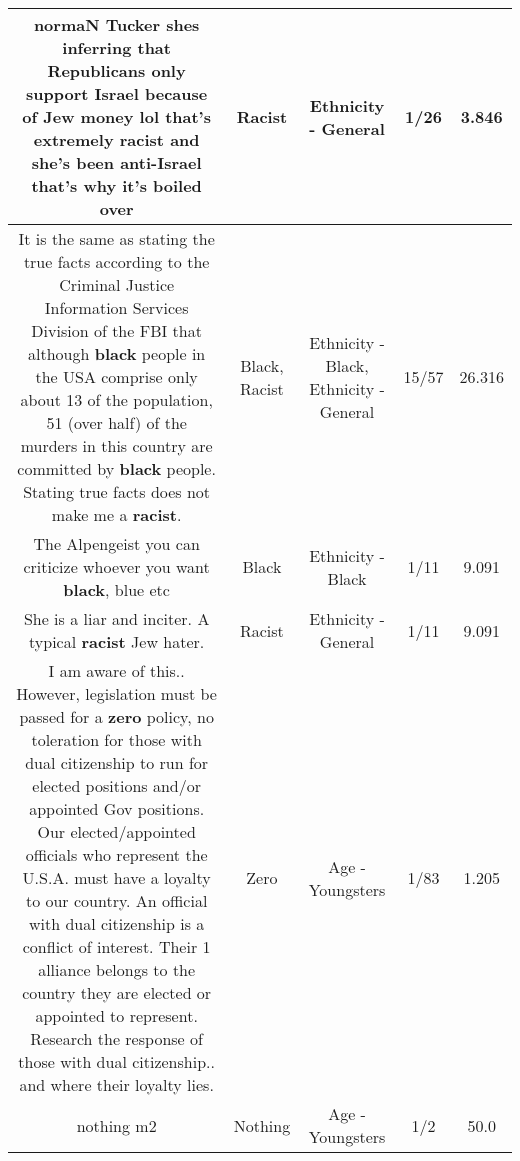 \documentclass[11pt]{article}
\newlength\mylength
\begin{document}
\begin{center}
\begin{longtable}{|C{.65\mylength}|C{.30\mylength}|C{.12\mylength}|C{.12\mylength}|C{.12\mylength}|}
  \small normaN Tucker shes inferring that Republicans only support Israel because of Jew money lol that's extremely \textbf{racist} and she's been anti-Israel that's why it's boiled over\normalsize   & Racist & Ethnicity - General & 1/26 & 3.846 \\  \hline
  \small It is the same as stating the true facts according to the Criminal Justice Information Services Division of the FBI that although \textbf{black} people in the USA comprise only about 13 of the population, 51 (over half) of the murders in this country are committed by \textbf{black} people. Stating true facts does not make me a \textbf{racist}.\normalsize   & Black, Racist & Ethnicity - Black, Ethnicity - General & 15/57 & 26.316 \\  \hline
  \small The Alpengeist you can criticize whoever you want \textbf{black}, blue etc\normalsize   & Black & Ethnicity - Black & 1/11 & 9.091 \\  \hline
  \small She is a liar and inciter. A typical \textbf{racist} Jew hater.\normalsize   & Racist & Ethnicity - General & 1/11 & 9.091 \\  \hline
  \small {}  I am aware of this.. However, legislation must be passed for a \textbf{zero} policy, no toleration for  those with dual citizenship to run for elected positions and/or appointed Gov positions. Our elected/appointed officials who represent the U.S.A. must have a loyalty to our country. An official with dual citizenship is a conflict of interest. Their  1 alliance belongs to the country they are elected or appointed to represent. Research the response of those with dual citizenship.. and where their loyalty lies.\normalsize   & Zero & Age - Youngsters & 1/83 & 1.205 \\  \hline
  \small nothing m2\normalsize   & Nothing & Age - Youngsters & 1/2 & 50.0 \\  \hline

\end{longtable}
\end{center}
\end{document}
